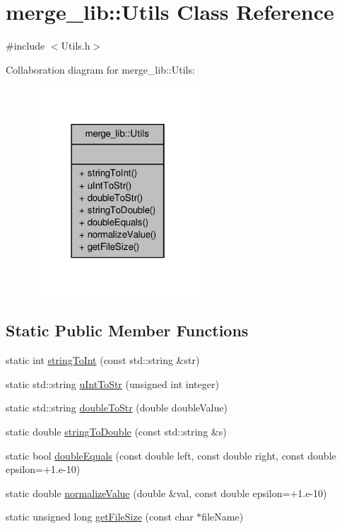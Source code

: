 \hypertarget{classmerge__lib_1_1_utils}{\section{merge\-\_\-lib\-:\-:Utils Class Reference}
\label{d4/d67/classmerge__lib_1_1_utils}
}


{\ttfamily \#include $<$Utils.\-h$>$}



Collaboration diagram for merge\-\_\-lib\-:\-:Utils\-:
\nopagebreak
\begin{figure}[H]
\begin{center}
\leavevmode
\includegraphics[width=178pt]{d0/d34/classmerge__lib_1_1_utils__coll__graph}
\end{center}
\end{figure}
\subsection*{Static Public Member Functions}
\begin{DoxyCompactItemize}
\item 
static int \hyperlink{classmerge__lib_1_1_utils_a1e6ab2d929fb6879433ff6ed87dcc18b}{string\-To\-Int} (const std\-::string \&str)
\item 
static std\-::string \hyperlink{classmerge__lib_1_1_utils_aec498be127dfac5839795ea5d07d84c6}{u\-Int\-To\-Str} (unsigned int integer)
\item 
static std\-::string \hyperlink{classmerge__lib_1_1_utils_af53ad8c0314cf4b736cfb4b9aed6f596}{double\-To\-Str} (double double\-Value)
\item 
static double \hyperlink{classmerge__lib_1_1_utils_a7a9b660e7ee4e9bb42a9cc98949da789}{string\-To\-Double} (const std\-::string \&s)
\item 
static bool \hyperlink{classmerge__lib_1_1_utils_a8a96be9d0d2be905e879f2cb7f4518a5}{double\-Equals} (const double left, const double right, const double epsilon=+1.e-\/10)
\item 
static double \hyperlink{classmerge__lib_1_1_utils_a304c2556b8192f7430af221676c16919}{normalize\-Value} (double \&val, const double epsilon=+1.e-\/10)
\item 
static unsigned long \hyperlink{classmerge__lib_1_1_utils_a3fb38a0acb99240682a8b18ba4851be3}{get\-File\-Size} (const char $\ast$file\-Name)
\end{DoxyCompactItemize}


